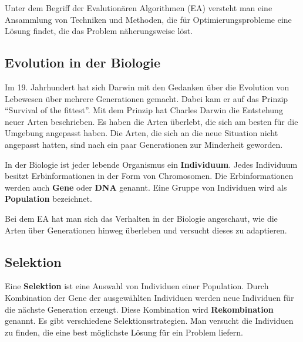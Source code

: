 
Unter dem Begriff der Evalution{\"a}ren Algorithmen (EA) versteht man eine Ansammlung von Techniken und Methoden, die f{\"u}r Optimierungsprobleme eine L{\"o}sung findet, die das Problem n{\"a}herungsweise l{\"o}st. \cite{weicker2015evolutionare} 


\subsection{Evolution in der Biologie}
Im 19. Jahrhundert hat sich Darwin mit den Gedanken {\"u}ber die Evolution von Lebewesen {\"u}ber mehrere Generationen gemacht. Dabei kam er auf das Prinzip "`Survival of the fittest"'. Mit dem Prinzip hat Charles Darwin die Entstehung neuer Arten beschrieben. Es haben die Arten {\"u}berlebt, die sich am besten f{\"u}r die Umgebung angepasst haben. Die Arten, die sich an die neue Situation nicht angepasst hatten, sind nach ein paar Generationen zur Minderheit geworden. \cite{hunermann2007brockhaus}

In der Biologie ist jeder lebende Organismus ein \textbf{Individuum}.
Jedes Individuum besitzt Erbinformationen in der Form von Chromosomen. Die Erbinformationen werden auch \textbf{Gene} oder \textbf{DNA} genannt. 
Eine Gruppe von Individuen wird als \textbf{Population} bezeichnet. 

Bei dem EA hat man sich das Verhalten in der Biologie angeschaut, wie die Arten {\"u}ber Generationen hinweg {\"u}berleben und versucht dieses zu adaptieren. \cite{flickevolutionare}

\subsection{Selektion}

Eine \textbf{Selektion} ist eine Auswahl von Individuen einer Population. Durch Kombination der Gene der ausgew{\"a}hlten Individuen werden neue Individuen f{\"u}r die n{\"a}chste Generation erzeugt. Diese Kombination wird \textbf{Rekombination} genannt.
Es gibt verschiedene Selektionsstrategien. Man versucht die Individuen zu finden, die eine best m{\"o}glichste L{\"o}sung f{\"u}r ein Problem liefern. \cite{weicker2015evolutionare, flickevolutionare}

